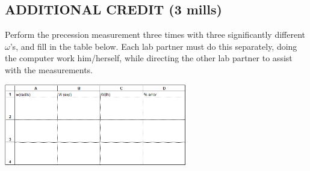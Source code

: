 \subsection*{ADDITIONAL CREDIT (3 mills)}

Perform the precession measurement three times with three significantly different \(\omega\)'s, and fill in the table below.  Each lab partner must do this separately, doing the computer work him/herself, while directing the other lab partner to assist with the measurements.
\begin{center} \includegraphics*[width=0.6\textwidth]{imgs/6labs/6Alab/6Aexp7/6a-exp7-fig18.png} \end{center}
